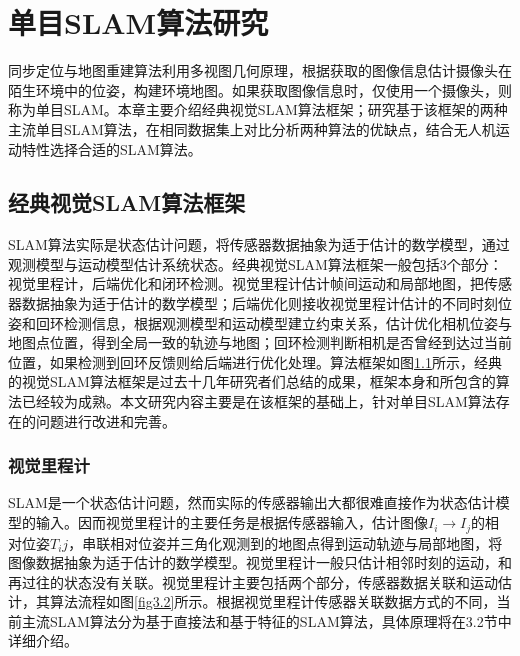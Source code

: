 
\chapter{单目SLAM算法研究}
\label{chap:ALGORITHM}

同步定位与地图重建算法利用多视图几何原理\upcite{[]}，根据获取的图像信息估计摄像头在陌生环境中的位姿，构建环境地图。如果获取图像信息时，仅使用一个摄像头，则称为单目SLAM。本章主要介绍经典视觉SLAM算法框架；研究基于该框架的两种主流单目SLAM算法，在相同数据集上对比分析两种算法的优缺点，结合无人机运动特性选择合适的SLAM算法。

\section{经典视觉SLAM算法框架}
SLAM算法实际是状态估计问题，将传感器数据抽象为适于估计的数学模型，通过观测模型与运动模型估计系统状态。经典视觉SLAM算法框架一般包括3个部分：视觉里程计，后端优化和闭环检测。视觉里程计估计帧间运动和局部地图，把传感器数据抽象为适于估计的数学模型；后端优化则接收视觉里程计估计的不同时刻位姿和回环检测信息，根据观测模型和运动模型建立约束关系，估计优化相机位姿与地图点位置，得到全局一致的轨迹与地图；回环检测判断相机是否曾经到达过当前位置，如果检测到回环反馈则给后端进行优化处理。算法框架如图\ref{fig3.1}所示，经典的视觉SLAM算法框架是过去十几年研究者们总结的成果，框架本身和所包含的算法已经较为成熟。本文研究内容主要是在该框架的基础上，针对单目SLAM算法存在的问题进行改进和完善。
\begin{figure}
\label{fig3.1}

\end{figure}
\subsection{视觉里程计}
SLAM是一个状态估计问题，然而实际的传感器输出大都很难直接作为状态估计模型的输入。因而视觉里程计的主要任务是根据传感器输入，估计图像$I_i \rightarrow I_j$的相对位姿$T_ij$，串联相对位姿并三角化观测到的地图点得到运动轨迹与局部地图，将图像数据抽象为适于估计的数学模型。视觉里程计一般只估计相邻时刻的运动，和再过往的状态没有关联。视觉里程计主要包括两个部分，传感器数据关联和运动估计，其算法流程如图\eqref{fig3.2}所示。根据视觉里程计传感器关联数据方式的不同，当前主流SLAM算法分为基于直接法和基于特征的SLAM算法，具体原理将在3.2节中详细介绍。
\begin{figure}
\label{fig3.2}

\end{figure}

